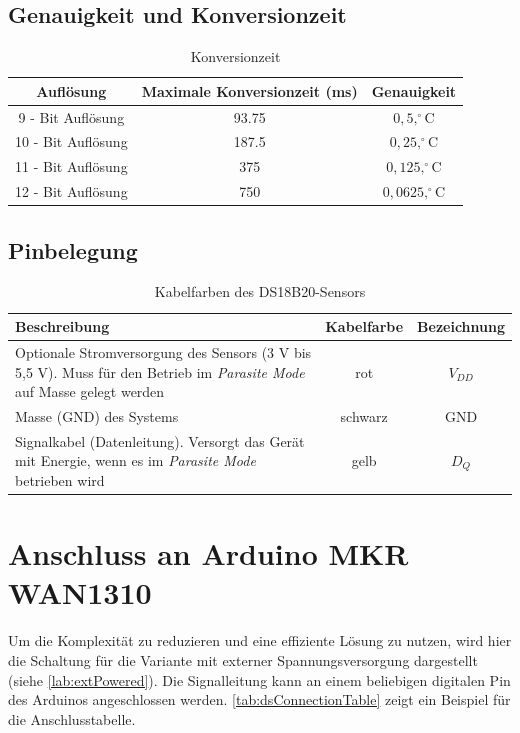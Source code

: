 \subsection{Genauigkeit und Konversionzeit}
\begin{table}[H]
	\centering
	\begin{tabular}{|c|c|c|}
		\hline
		\textbf{Auflösung} & \textbf{Maximale Konversionzeit (ms)} & \textbf{Genauigkeit}\\
		\hline
		9 - Bit Auflösung & 93.75 & $0{,}5,^\circ\mathrm{C}$\\
		\hline
		10 - Bit Auflösung& 187.5 & $0{,}25,^\circ\mathrm{C}$\\
		\hline
		11 - Bit Auflösung& 375 & $0{,}125,^\circ\mathrm{C}$ \\
		\hline
		12 - Bit Auflösung& 750 & $0{,}0625,^\circ\mathrm{C}$\\
		\hline
	\end{tabular}
	\caption{Konversionzeit}
	\label{ds18b20:conversionTimes}
\end{table}

\subsection{Pinbelegung}
\begin{table}[H]
	\centering
	\begin{tabularx}{\textwidth}{|X|c|c|}
		\hline
		\textbf{Beschreibung} & \textbf{Kabelfarbe} & \textbf{Bezeichnung} \\
		\hline
		Optionale Stromversorgung des Sensors (3 V bis 5,5 V). Muss für den Betrieb im \textit{Parasite Mode} auf Masse gelegt werden & rot & $V_{DD}$\\
		\hline
		Masse (GND) des Systems & schwarz & GND\\
		\hline
		Signalkabel (Datenleitung). Versorgt das Gerät mit Energie, wenn es im \textit{Parasite Mode} betrieben wird & gelb & $D_Q$ \\
		\hline
	\end{tabularx}
	\caption{Kabelfarben des DS18B20-Sensors}
\end{table}

\section{Anschluss an Arduino MKR WAN1310}	
	Um die Komplexität zu reduzieren und eine effiziente Lösung zu nutzen, wird hier die Schaltung für die Variante mit externer Spannungsversorgung dargestellt (siehe \autoref{lab:extPowered}). Die Signalleitung kann an einem beliebigen digitalen Pin des Arduinos angeschlossen werden. \autoref{tab:dsConnectionTable} zeigt ein Beispiel für die Anschlusstabelle.
	
